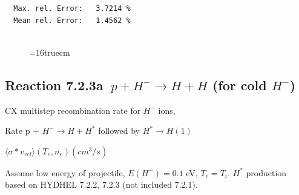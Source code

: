 \documentclass[12pt,dvips]{article}
\begin{document}
\begin{small}
\begin{verbatim}
  Max. rel. Error:   3.7214 %
  Mean rel. Error:   1.4562 %


\end{verbatim}\end{small}
\begin{figure} \label{2.2.5mai}
\epsfxsize=16truecm
\end{figure}
\newpage

\subsection{
Reaction 7.2.3a   $\  p + H^{-} \rightarrow  H + H$ (for cold $H^-$)
}
  CX multistep recombination rate for $H^-$ ions,
 \cite{kn:Sawada}

  Rate p + $H^- \rightarrow H + H^*$ followed by $H^* \rightarrow H(1)$

$  \langle \sigma*v_{rel} \rangle(T_e,n_e) (cm^3/s)$

Assume low energy of projectile, $E(H^-)=0.1$ eV, $T_e = T_i$.
$H^*$ production based on HYDHEL 7.2.2, 7.2.3 (not included 7.2.1).
\end{document}
